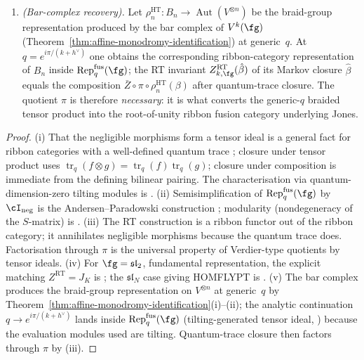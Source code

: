 \begin{proposition}
\begin{enumerate}[label=\textup{(\roman*)}]
 \item \emph{(Bar-complex recovery).} Let $\rho_n^{\mathrm{HT}} \colon B_n \to \operatorname{Aut}(V^{\otimes n})$ be the braid-group representation produced by the bar complex of $V^k(\fg)$ (Theorem~\ref{thm:affine-monodromy-identification}) at generic~$q$. At $q = e^{i\pi/(k+h^\vee)}$ one obtains the corresponding ribbon-category representation of $B_n$ inside $\mathrm{Rep}_q^{\mathrm{fus}}(\fg)$; the RT invariant $Z^{\mathrm{RT}}_{k,\fg}(\hat{\beta})$ of its Markov closure $\hat{\beta}$ equals the composition $\bar{Z} \circ \pi \circ \rho_n^{\mathrm{HT}}(\beta)$ after quantum-trace closure. The quotient $\pi$ is therefore \emph{necessary}: it is what converts the generic-$q$ braided tensor product into the root-of-unity ribbon fusion category underlying Jones.
\end{enumerate}
\end{proposition}

\begin{proof}
(i) That the negligible morphisms form a tensor ideal is a general fact for ribbon categories with a well-defined quantum trace \cite[Prop.~4.4.1]{BaKi01}; closure under tensor product uses $\operatorname{tr}_q(f \otimes g) = \operatorname{tr}_q(f)\operatorname{tr}_q(g)$; closure under composition is immediate from the defining bilinear pairing. The characterisation via quantum-dimension-zero tilting modules is \cite[Thm.~4.1]{And92}.
(ii) Semisimplification of $\mathrm{Rep}_q^{\mathrm{fus}}(\fg)$ by $\cI_{\mathrm{neg}}$ is the Andersen--Paradowski construction \cite{AP95}; modularity (nondegeneracy of the $S$-matrix) is \cite[Thm.~3.3.20]{BaKi01}.
(iii) The RT construction is a ribbon functor out of the ribbon category; it annihilates negligible morphisms because the quantum trace does. Factorisation through $\pi$ is the universal property of Verdier-type quotients by tensor ideals.
(iv) For $\fg = \mathfrak{sl}_2$, fundamental representation, the explicit matching $Z^{\mathrm{RT}} = J_K$ is \cite{RT90}; the $\mathfrak{sl}_N$ case giving HOMFLYPT is \cite[\S3]{Tu94}.
(v) The bar complex produces the braid-group representation on $V^{\otimes n}$ at generic~$q$ by Theorem~\ref{thm:affine-monodromy-identification}(i)--(ii); the analytic continuation $q \to e^{i\pi/(k+h^\vee)}$ lands inside $\mathrm{Rep}_q^{\mathrm{fus}}(\fg)$ (tilting-generated tensor ideal, \cite[Thm.~2.5]{AP95}) because the evaluation modules used are tilting. Quantum-trace closure then factors through $\pi$ by (iii).
\end{proof}


